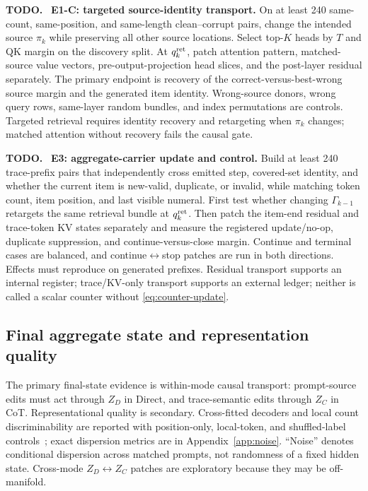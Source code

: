 \documentclass[11pt]{article}
\newenvironment{todobox}
  {\begin{center}\begin{minipage}{0.95\linewidth}\color{todored}\textbf{TODO.}~}
  {\end{minipage}\end{center}}
\begin{document}
\begin{todobox}
\textbf{E1-C: targeted source-identity transport.} On at least 240 same-count, same-position, and same-length clean--corrupt pairs, change the intended source $\pi_k$ while preserving all other source locations. Select top-$K$ heads by $T$ and QK margin on the discovery split. At $q_k^{\rm ret}$, patch attention pattern, matched-source value vectors, pre-output-projection head slices, and the post-layer residual separately. The primary endpoint is recovery of the correct-versus-best-wrong source margin and the generated item identity. Wrong-source donors, wrong query rows, same-layer random bundles, and index permutations are controls. Targeted retrieval requires identity recovery and retargeting when $\pi_k$ changes; matched attention without recovery fails the causal gate.
\end{todobox}

\begin{todobox}
\textbf{E3: aggregate-carrier update and control.} Build at least 240 trace-prefix pairs that independently cross emitted step, covered-set identity, and whether the current item is new-valid, duplicate, or invalid, while matching token count, item position, and last visible numeral. First test whether changing $\Gamma_{k-1}$ retargets the same retrieval bundle at $q_k^{\rm ret}$. Then patch the item-end residual and trace-token KV states separately and measure the registered update/no-op, duplicate suppression, and continue-versus-close margin. Continue and terminal cases are balanced, and continue$\leftrightarrow$stop patches are run in both directions. Effects must reproduce on generated prefixes. Residual transport supports an internal register; trace/KV-only transport supports an external ledger; neither is called a scalar counter without \cref{eq:counter-update}.
\end{todobox}

\subsection{Final aggregate state and representation quality}

The primary final-state evidence is within-mode causal transport: prompt-source edits must act through $Z_D$ in Direct, and trace-semantic edits through $Z_C$ in CoT. Representational quality is secondary. Cross-fitted decoders and local count discriminability are reported with position-only, local-token, and shuffled-label controls~\citep{hewitt2019control}; exact dispersion metrics are in Appendix~\ref{app:noise}. ``Noise'' denotes conditional dispersion across matched prompts, not randomness of a fixed hidden state. Cross-mode $Z_D\leftrightarrow Z_C$ patches are exploratory because they may be off-manifold.
\end{document}
